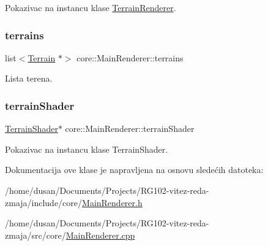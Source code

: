 Pokazivac na instancu klase \hyperlink{classcore_1_1TerrainRenderer}{Terrain\+Renderer}. 

\mbox{\label{classcore_1_1MainRenderer_ada8a51626222137e00ae29445e28f892}} 
\subsubsection{\texorpdfstring{terrains}{terrains}}
{\footnotesize\ttfamily list$<$\hyperlink{classterrain_1_1Terrain}{Terrain} $\ast$$>$ core\+::\+Main\+Renderer\+::terrains\hspace{0.3cm}{\ttfamily [private]}}



Lista terena. 

\mbox{\label{classcore_1_1MainRenderer_a502a7c6f714266f27601913496c396f3}} 
\subsubsection{\texorpdfstring{terrain\+Shader}{terrainShader}}
{\footnotesize\ttfamily \hyperlink{classshader_1_1TerrainShader}{Terrain\+Shader}$\ast$ core\+::\+Main\+Renderer\+::terrain\+Shader\hspace{0.3cm}{\ttfamily [private]}}



Pokazivac na instancu klase Terrain\+Shader. 



Dokumentacija ove klase je napravljena na osnovu sledećih datoteka\+:\begin{DoxyCompactItemize}
\item 
/home/dusan/\+Documents/\+Projects/\+R\+G102-\/vitez-\/reda-\/zmaja/include/core/\hyperlink{MainRenderer_8h}{Main\+Renderer.\+h}\item 
/home/dusan/\+Documents/\+Projects/\+R\+G102-\/vitez-\/reda-\/zmaja/src/core/\hyperlink{MainRenderer_8cpp}{Main\+Renderer.\+cpp}\end{DoxyCompactItemize}
